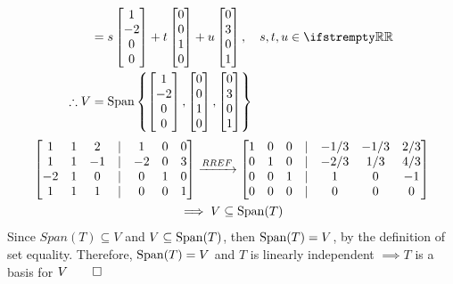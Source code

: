 \documentclass[12pt, a4paper]{article}
\begin{document}
\begin{enumerate}[Q\arabic*.]
\begin{enumerate}[(\alph*)]
\begin{align*}
                        &= s\begin{bmatrix}1\\-2\\0\\0\end{bmatrix} + t\begin{bmatrix}0\\0\\1\\0\end{bmatrix} + u\begin{bmatrix}0\\3\\0\\1\end{bmatrix},\quad s,t,u\in \RR\\
          \therefore V &= \Span\left\{\begin{bmatrix}1\\-2\\0\\0\end{bmatrix},\begin{bmatrix}0\\0\\1\\0\end{bmatrix},\begin{bmatrix}0\\3\\0\\1\end{bmatrix}\right\}\\
        \end{align*}
        \vspace{-2em}
        \begin{gather*}
          \begin{bmatrix}
            1 & 1 & 2 & | &1 & 0 & 0\\
            1 & 1 & -1 & | &-2 & 0 & 3\\
            -2 & 1 & 0 & | &0 & 1 & 0\\
            1 & 1 & 1 & | &0 & 0 & 1\\
          \end{bmatrix}\xrightarrow{RREF}
          \begin{bmatrix}
            1 & 0 & 0 &|& -1 /3 & -1 /3 & 2 /3\\
            0 & 1 & 0 &|& -2 /3 & 1 /3 & 4 /3\\
            0 & 0 & 1 &|& 1 & 0 & -1\\
            0 & 0 & 0 &|& 0 & 0 & 0
          \end{bmatrix}\\
                       \implies V \subseteq \operatorname{Span}(T)
        \end{gather*}
      Since $Span(T) \subseteq V$ and $V \subseteq \operatorname{Span}(T)$, then $\operatorname{Span}(T) = V$, by the definition of set equality. Therefore, $\operatorname{Span}(T) = V$ and $T$ is linearly independent $\implies T$ is a basis for $V \qed$


\end{enumerate}
\end{enumerate}
\end{document}
